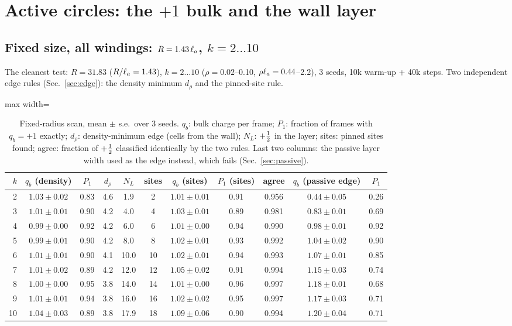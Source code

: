 \section{Active circles: the $+1$ bulk and the wall layer}\label{sec:ccharge}
\subsection{Fixed size, all windings: $R=1.43\,\ell_a$, $k=2\dots10$}
The cleanest test: $R=31.83$ ($R/\ell_a=1.43$), $k=2\dots10$ ($\rho=0.02$--0.10, $\rho\ell_a=0.44$--2.2), 3 seeds, 10k warm-up + 40k
steps. Two independent edge rules (Sec.~\ref{sec:edge}): the density minimum $d_\rho$ and the pinned-site rule.
\begin{table}[H]\centering\small
\caption{Fixed-radius scan, mean $\pm$ s.e.\ over 3 seeds. $q_b$: bulk charge per frame; $P_1$: fraction of frames with
$q_b=+1$ exactly; $d_\rho$: density-minimum edge (cells from the wall); $N_L$: $+\tfrac12$ in the layer; sites: pinned sites
found; agree: fraction of $+\tfrac12$ classified identically by the two rules. Last two columns: the passive layer width
used as the edge instead, which fails (Sec.~\ref{sec:passive}).}\label{tab:rscan}
\begin{adjustbox}{max width=\textwidth}
\begin{tabular}{rcccccccc|cc}\toprule
$k$ & $q_b$ (density) & $P_1$ & $d_\rho$ & $N_L$ & sites & $q_b$ (sites) & $P_1$ (sites) & agree & $q_b$ (passive edge) & $P_1$\\\midrule
2 & $1.03\pm0.02$ & 0.83 & 4.6 & 1.9 & 2 & $1.01\pm0.01$ & 0.91 & 0.956 & $0.44\pm0.05$ & 0.26\\
3 & $1.01\pm0.01$ & 0.90 & 4.2 & 4.0 & 4 & $1.03\pm0.01$ & 0.89 & 0.981 & $0.83\pm0.01$ & 0.69\\
4 & $0.99\pm0.00$ & 0.92 & 4.2 & 6.0 & 6 & $1.01\pm0.00$ & 0.94 & 0.990 & $0.98\pm0.01$ & 0.92\\
5 & $0.99\pm0.01$ & 0.90 & 4.2 & 8.0 & 8 & $1.02\pm0.01$ & 0.93 & 0.992 & $1.04\pm0.02$ & 0.90\\
6 & $1.01\pm0.01$ & 0.90 & 4.1 & 10.0 & 10 & $1.02\pm0.01$ & 0.94 & 0.993 & $1.07\pm0.01$ & 0.85\\
7 & $1.01\pm0.02$ & 0.89 & 4.2 & 12.0 & 12 & $1.05\pm0.02$ & 0.91 & 0.994 & $1.15\pm0.03$ & 0.74\\
8 & $1.00\pm0.00$ & 0.95 & 3.8 & 14.0 & 14 & $1.01\pm0.00$ & 0.96 & 0.997 & $1.18\pm0.01$ & 0.68\\
9 & $1.01\pm0.01$ & 0.94 & 3.8 & 16.0 & 16 & $1.02\pm0.02$ & 0.95 & 0.997 & $1.17\pm0.03$ & 0.71\\
10 & $1.04\pm0.03$ & 0.89 & 3.8 & 17.9 & 18 & $1.09\pm0.06$ & 0.90 & 0.994 & $1.20\pm0.04$ & 0.71\\\bottomrule
\end{tabular}
\end{adjustbox}
\end{table}
